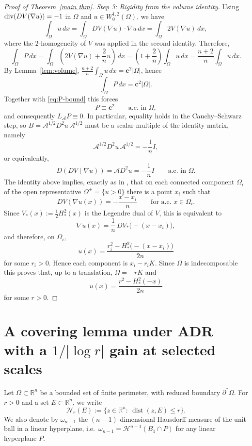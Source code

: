 \documentclass[reqno,11pt]{amsart}
\newcommand{\Ncal}{\mathcal{N}}
\def\dist{{\mathop\mathrm{dist}}}
\numberwithin{equation}{section}
\theoremstyle{remark}
\begin{document}
\begin{proof}[Proof of Theorem~\ref{main thm}]
\smallskip
\noindent\emph{Step 3: Rigidity from the volume identity.}
Using ${\rm div}(DV(\nabla u))=-1$ in $\Omega$ and $u\in W^{1,2}_0(\Omega)$, we have
\[
\int_\Omega u\,dx=\int_\Omega DV(\nabla u)\cdot \nabla u\,dx
{= \int_\Omega 2V(\nabla u)\,dx,}
\]
{where the $2$-homogeneity of $V$ was applied in the second identity.} 
Therefore,
\[
\int_\Omega P\,dx
=\int_\Omega\left(2V(\nabla u)+\frac{2}{n}u\right)\,dx
=\left(1+\frac{2}{n}\right)\int_\Omega u\,dx
=\frac{n+2}{n}\int_\Omega u\,dx.
\]
By Lemma~\ref{lem:volume}, $\frac{n+2}{n}\int_\Omega u\,dx=\mathbf c^2|\Omega|$, hence
\[
\int_\Omega P\,dx=\mathbf c^2|\Omega|.
\]
Together with \eqref{eq:P-bound} this forces
\[
P\equiv \mathbf c^2 \qquad\text{a.e.\ in }\Omega,
\]
and consequently $L_{\mathcal A}P\equiv 0$. In particular, equality holds in the Cauchy--Schwarz step, so
$B=\mathcal A^{1/2}D^2u\,\mathcal A^{1/2}$ must be a scalar multiple of the identity matrix, namely
\[
\mathcal A^{1/2}D^2u\,\mathcal A^{1/2}=-\frac{1}{n}I,
\]
or equivalently,
\[
D(DV(\nabla u))=\mathcal A D^2u=-\frac{1}{n}I \qquad\text{a.e.\ in }\Omega.
\]
{The identity above implies, exactly as in
\cite[(5.17)--(5.19)]{CS2009}, that on each connected component $\Omega_i$ of the open representative
$\Omega^+=\{u>0\}$ there is a point $x_i$ such that}
\[
{
DV(\nabla u(x))=-\frac{x-x_i}{n}\qquad\text{for a.e.\ }x\in\Omega_i .
}
\]
{Since $V_*(x):=\frac12 H_*^2(x)$ is the Legendre dual of $V$, this is equivalent to}
\[
{
\nabla u(x)=\frac1n\,DV_*\bigl(-(x-x_i)\bigr),
}
\]
{and therefore, on $\Omega_i$,}
\[
{
u(x)=\frac{r_i^2-H_*^2\bigl(-(x-x_i)\bigr)}{2n}
}
\]
{for some $r_i>0$. Hence each component is $x_i-r_iK$. 
Since $\Omega$ is indecomposable this proves that, up to a translation, $\Omega=-rK$ and}
\[
{
u(x)=\frac{r^2-H_*^2(-x)}{2n}
}
\]
{for some $r>0$.}
\end{proof}

\appendix
\section{A covering lemma under ADR with a $1/|\log r|$ gain at selected scales}

Let $\Omega\subset\mathbb R^n$ be a bounded set of finite perimeter, with reduced boundary $\partial^*\Omega$.
For $r>0$ and a set $E\subset\mathbb R^n$, we write
\[
\Ncal_r(E):=\{z\in\mathbb R^n:\ \dist(z,E)\le r\}.
\]
We also denote by $\omega_{n-1}$ the $(n-1)$-dimensional Hausdorff measure of the unit ball in a linear hyperplane,
i.e.\ $\omega_{n-1}=\mathscr H^{n-1}(B_1\cap P)$ for any linear hyperplane $P$.
\end{document}
